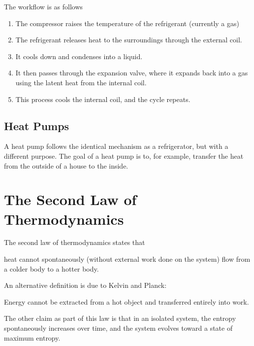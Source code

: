 \documentclass[a4paper,12pt]{article}
\let\oldsection\section
\renewcommand\section{\clearpage\oldsection}
\begin{document}
The workflow is as follows
\begin{enumerate}
  \item The compressor raises the temperature of the refrigerant (currently a gas)
  \item The refrigerant releases heat to the surroundings through the external coil.
  \item It cools down and condenses into a liquid.
  \item It then passes through the expansion valve, where it expands back into a gas using the latent heat from the internal coil.
  \item This process cools the internal coil, and the cycle repeats.
\end{enumerate}

\pagebreak

\subsection{Heat Pumps}

A heat pump follows the identical mechanism as a refrigerator, but with a different purpose. The goal of a heat pump is to, for example, transfer the heat from the outside of a house to the inside.

\section{The Second Law of Thermodynamics}

\begin{law}
  The second law of thermodynamics states that\\
  \begin{center}
    \begin{minipage}{0.9\textwidth}
      \begin{center}
        heat cannot spontaneously (without external work done on the system) flow from a colder body to a hotter body.
      \end{center}
    \end{minipage}
  \end{center}\vspace*{1cm}

  An alternative definition is due to Kelvin and Planck:\\
  \begin{center}
    \begin{minipage}{0.9\textwidth}
      \begin{center}
        Energy cannot be extracted from a hot object and transferred entirely into work.

      \end{center}

    \end{minipage}
  \end{center}

  The other claim as part of this law is that in an isolated system, the entropy spontaneously increases over time, and the system evolves toward a state of maximum entropy.

\end{law}
\end{document}
